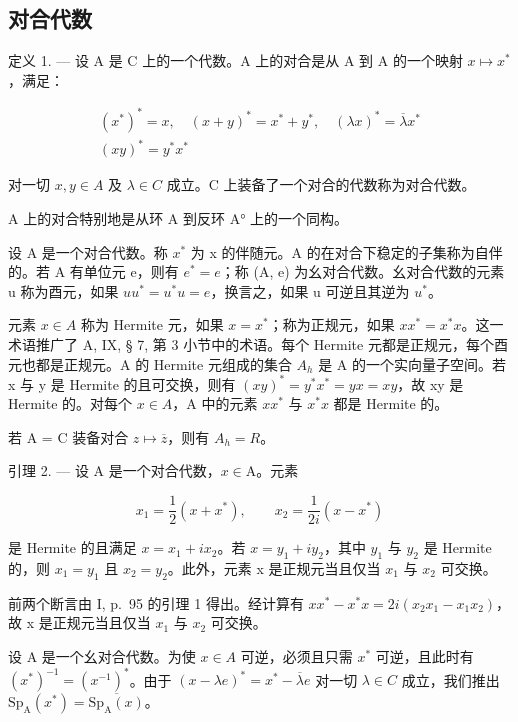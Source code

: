 \subsection{对合代数}

定义 1. --- 设 A 是 C 上的一个代数。A 上的对合是从 A 到 A 的一个映射 \(x \mapsto x^{*}\)，满足：

\[
\begin{array}{c} (x ^ {*}) ^ {*} = x, \quad (x + y) ^ {*} = x ^ {*} + y ^ {*}, \quad (\lambda x) ^ {*} = \overline {{\lambda}} x ^ {*} \\ (x y) ^ {*} = y ^ {*} x ^ {*} \end{array}
\]

对一切 \(x, y \in A\) 及 \(\lambda \in C\) 成立。C 上装备了一个对合的代数称为对合代数。

A 上的对合特别地是从环 A 到反环 A° 上的一个同构。

设 A 是一个对合代数。称 \(x^{*}\) 为 x 的伴随元。A 的在对合下稳定的子集称为自伴的。若 A 有单位元 e，则有 \(e^{*} = e\)；称 (A, e) 为幺对合代数。幺对合代数的元素 u 称为酉元，如果 \(uu^{*} = u^{*}u = e\)，换言之，如果 u 可逆且其逆为 \(u^{*}\)。

元素 \(x \in A\) 称为 Hermite 元，如果 \(x = x^{*}\)；称为正规元，如果 \(xx^{*} = x^{*}x\)。这一术语推广了 A, IX, § 7, 第 3 小节中的术语。每个 Hermite 元都是正规元，每个酉元也都是正规元。A 的 Hermite 元组成的集合 \(A_{h}\) 是 A 的一个实向量子空间。若 x 与 y 是 Hermite 的且可交换，则有 \((xy)^{*} = y^{*}x^{*} = yx = xy\)，故 xy 是 Hermite 的。对每个 \(x \in A\)，A 中的元素 \(xx^{*}\) 与 \(x^{*}x\) 都是 Hermite 的。

若 A = C 装备对合 \(z \mapsto \overline{z}\)，则有 \(A_{h} = R\)。

引理 2. --- 设 A 是一个对合代数，\(x \in \mathrm{A}\)。元素

\[
x _ {1} = \frac {1}{2} (x + x ^ {*}), \qquad x _ {2} = \frac {1}{2 i} (x - x ^ {*})
\]

是 Hermite 的且满足 \(x = x_{1} + ix_{2}\)。若 \(x = y_{1} + iy_{2}\)，其中 \(y_{1}\) 与 \(y_{2}\) 是 Hermite 的，则 \(x_{1} = y_{1}\) 且 \(x_{2} = y_{2}\)。此外，元素 x 是正规元当且仅当 \(x_{1}\) 与 \(x_{2}\) 可交换。

前两个断言由 I, p.~95 的引理 1 得出。经计算有 \(xx^{*} - x^{*}x = 2i(x_{2}x_{1} - x_{1}x_{2})\)，故 x 是正规元当且仅当 \(x_{1}\) 与 \(x_{2}\) 可交换。

设 A 是一个幺对合代数。为使 \(x \in A\) 可逆，必须且只需 \(x^{*}\) 可逆，且此时有 \((x^{*})^{-1} = (x^{-1})^{*}\)。由于 \((x - \lambda e)^{*} = x^{*} - \overline{\lambda}e\) 对一切 \(\lambda \in C\) 成立，我们推出 \(\mathrm{Sp}_{\mathrm{A}}(x^{*}) = \overline{\mathrm{Sp}_{\mathrm{A}}(x)}\)。

